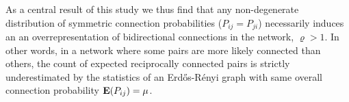 As a central result of this study we thus find that any non-degenerate distribution of symmetric connection probabilities ($P_{ij} = P_{ji}$) necessarily induces an an overrepresentation of bidirectional connections in the network, $\varrho > 1$. In other words, in a network where some pairs are more likely connected than others, the count of expected reciprocally connected pairs is strictly underestimated by the statistics of an Erd\H{o}s-R\'{e}nyi graph with same overall connection probability $\operatorname{\mathbf{E}}(P_{ij}) = \mu$.






